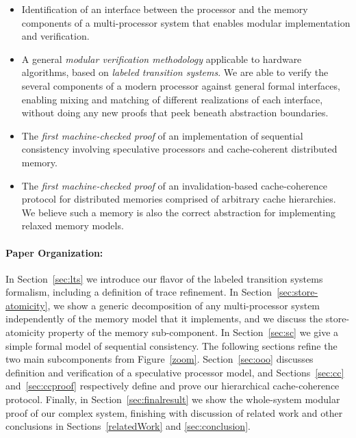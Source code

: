 \begin{itemize} 
\item Identification of an interface between the processor and the memory
components of a multi-processor system that enables modular implementation and
verification.

\item A general \emph{modular verification methodology} applicable to hardware
  algorithms, based on \emph{labeled transition systems}.
We are able to verify
  the several components of a modern processor 
against general formal interfaces,
  enabling mixing and matching of different realizations of each interface,
  without doing any new proofs that peek beneath abstraction boundaries.

\item The \emph{first machine-checked proof} of an implementation of sequential
  consistency involving speculative processors and cache-coherent distributed
  memory.

\item The \emph{first machine-checked proof} of an invalidation-based
  cache-coherence protocol for distributed memories comprised of arbitrary
  cache hierarchies. We believe such a memory is also the correct abstraction for
  implementing relaxed memory models.
\end{itemize}

\paragraph{Paper Organization:} In Section~\ref{sec:lts} we introduce our
flavor of the labeled transition systems formalism, including a definition of
trace refinement. In Section~\ref{sec:store-atomicity}, we show a generic
decomposition of any multi-processor system independently of the memory model
that it implements, and we discuss the store-atomicity property of the memory
sub-component. In Section~\ref{sec:sc} we
give a simple formal model of sequential consistency.  The
following sections refine the two main subcomponents from Figure~\ref{zoom}.
Section~\ref{sec:ooo} discusses definition and verification of a speculative
processor model, and Sections~\ref{sec:cc} and~\ref{sec:ccproof} respectively
define and prove our hierarchical cache-coherence protocol.  Finally, in
Section~\ref{sec:finalresult} we show the whole-system modular proof of our
complex system, finishing with discussion of related work and other conclusions in
Sections~\ref{relatedWork} and \ref{sec:conclusion}.

